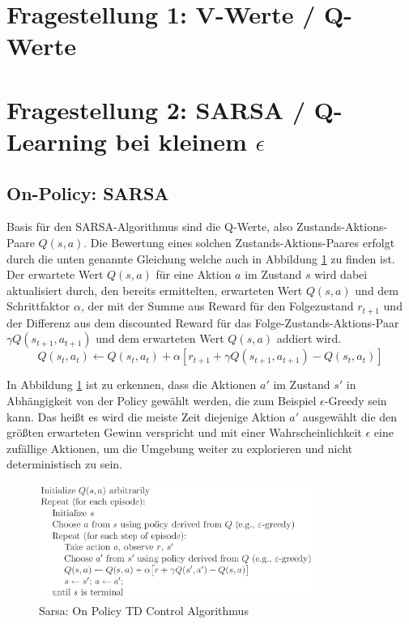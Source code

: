 \documentclass[10pt]{scrartcl}
\author{Pascal Jäger, Stefan Münchow, Armin Steudte,\\ Milena Rötting, Sven-Andjes Pahl, Carsten Noetzel, Oliver Steenbuck}
\title{\titletext}
\date{01.06.2012}
\begin{document}
\maketitle

\setcounter{tocdepth}{3}
\tableofcontents
\listoffigures

\section{Fragestellung 1: V-Werte / Q-Werte}

\section{Fragestellung 2: SARSA / Q-Learning bei kleinem $\epsilon$}
\subsection{On-Policy: SARSA}
Basis für den SARSA-Algorithmus sind die Q-Werte, also Zustands-Aktions-Paare $Q(s,a)$. Die Bewertung eines solchen Zustands-Aktions-Paares erfolgt durch die unten genannte Gleichung welche auch in Abbildung \ref{fig:Sarsa} zu finden ist.\\
Der erwartete Wert $Q(s,a)$ für eine Aktion $a$ im Zustand $s$ wird dabei aktualisiert durch, den bereits ermittelten, erwarteten Wert $Q(s,a)$ und dem Schrittfaktor $\alpha$, der mit der Summe aus Reward für den Folgezustand $r_{t+1}$ und der Differenz aus dem discounted Reward für das Folge-Zustands-Aktions-Paar $\gamma Q(s_{t+1}, a_{t+1})$ und dem erwarteten Wert $Q(s,a)$ addiert wird.\\

\begin{equation}
Q(s_{t},a_{t}) \leftarrow Q(s_{t},a_{t}) + \alpha [r_{t+1} + \gamma Q(s_{t+1},a_{t+1}) - Q(s_{t},a_{t})]
\end{equation}

In Abbildung \ref{fig:Sarsa} ist zu erkennen, dass die Aktionen $a'$ im Zustand $s'$ in Abhängigkeit von der Policy gewählt werden, die zum Beispiel $\epsilon$-Greedy sein kann. Das heißt es wird die meiste Zeit diejenige Aktion $a'$ ausgewählt die den größten erwarteten Gewinn verspricht und mit einer Wahrscheinlichkeit $\epsilon$ eine zufällige Aktionen, um die Umgebung weiter zu explorieren und nicht deterministisch zu sein.

\begin{figure}[htbp]
	\centering	\includegraphics[width=0.8\textwidth]{Bilder/Sarsa.png}
	\caption{Sarsa: On Policy TD Control Algorithmus}
	\label{fig:Sarsa}
\end{figure}
\end{document}
